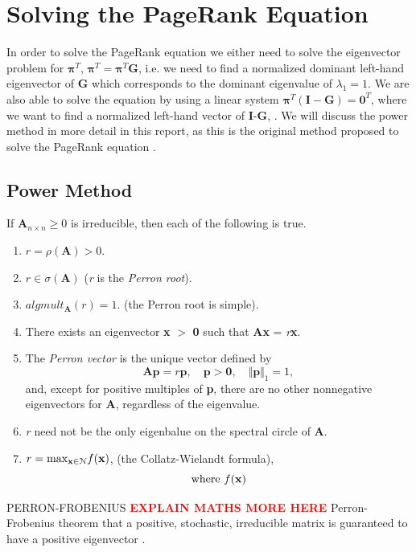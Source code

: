 \documentclass[11pt]{report}
\begin{document}
\section{Solving the PageRank Equation} \label{sec:solve}
In order to solve the PageRank equation we either need to solve the eigenvector problem for $\boldsymbol{\pi}^T$, \(\boldsymbol{\pi}^T = \boldsymbol{\pi}^T\textbf{G}\), i.e. we need to find a normalized dominant left-hand eigenvector of \textbf{G} which corresponds to the dominant eigenvalue of $\lambda_1 = 1$. We are also able to solve the equation by using a linear system \(\boldsymbol{\pi}^T(\textbf{I}-\textbf{G})=\textbf{0}^T\), where we want to find a normalized left-hand vector of \textbf{I}-\textbf{G}, \cite{langville}. We will discuss the power method in more detail in this report, as this is the original method proposed to solve the PageRank equation \cite{langville}.

\subsection{Power Method} \label{sec:power}
\begin{theorem} \normalfont
If \(\textbf{A}_{n \times n} \geq 0\) is irreducible, then each of the following is true.
\begin{enumerate}
\item $r = \rho(\textbf{A}) > 0$.
\item $r \in \sigma (\textbf{A}) $ (\textit{r} is the \textit{Perron root}).
\item $alg mult_\textbf{A}(r) = 1$. (the Perron root is simple).
\item There exists an eigenvector \textbf{x} $>$ \textbf{0} such that \textbf{Ax} = \textit{r}\textbf{x}.
\item The \textit{Perron vector} is the unique vector defined by 
\[\textbf{Ap}=r\textbf{p}, \quad \textbf{p}>\textbf{0}, \quad \Vert \textbf{p} \Vert _1 = 1, \] and, except for positive multiples of \textbf{p}, there are no other nonnegative eigenvectors for \textbf{A}, regardless of the eigenvalue.
\item \textit{r} need not be the only eigenbalue on the spectral circle of \textbf{A}.
\item \(r=\textnormal{max}_{\textbf{x}\in \mathcal{N}} f(\textbf{x})\), (the Collatz-Wielandt formula), 
\[\textnormal{where } f(\textbf{x})\]


\end{enumerate}

\end{theorem}
PERRON-FROBENIUS \cite{meyer2000matrix}  \cite{gallager1992discrete} 
\textcolor{red}{\textbf{EXPLAIN MATHS MORE HERE}} Perron-Frobenius theorem that a positive, stochastic, irreducible matrix is guaranteed to have a positive eigenvector \cite{thorson2004modeling}.
\end{document}

